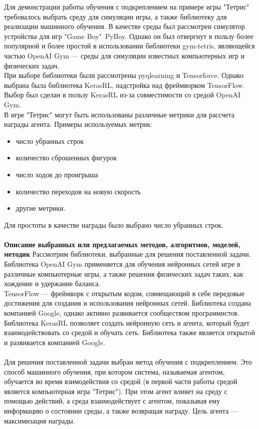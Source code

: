 \documentclass{article}
\begin{document}
Для демонстрации работы обучения с подкреплением на примере игры "Тетрис" требовалось выбрать среду для симуляции игры, а также библиотеку для реализации машинного обучения. 
В качестве среды был рассмотрен симулятор устройства для игр "Game Boy"\ PyBoy\cite{litlink11}. Однако он был отвергнут в пользу более популярной и более простой в использовании библиотеки gym-tetris\cite{litlink12}, являющейся частью OpenAI Gym\cite{litlink13} — среды для симуляции известных компьютерных игр и физических задач.\\
При выборе библиотеки были рассмотрены pyqlearning\cite{litlink14} и Tensorforce\cite{litlink15}. Однако выбрана была библиотека KerasRL\cite{litlink16}, надстройка над фреймворком TensorFlow\cite{litlink17}. Выбор был сделан в пользу KerasRL из-за совместимости со средой OpenAI Gym.\\
В игре "Тетрис" могут быть использованы различные метрики для рассчета награды агента. Примеры используемых метрик:
\begin{itemize}
\item число убранных строк
\item количество сброшенных фигурок
\item число ходов до проигрыша
\item количество переходов на новую скорость
\item другие метрики.
\end{itemize}
Для простоты в качестве награды было выбрано число убранных строк.\\~\\
\textbf{Описание выбранных или предлагаемых методов, алгоритмов, моделей, методик}
Рассмотрим библиотеки, выбранные для решения поставленной задачи. Библиотека OpenAI Gym применяется для обучения нейронных сетей игре в различные компьютерные игры, а также решения физических задач таких, как хождение и удержание баланса. \\
TensorFlow — фреймворк с открытым кодом, совмещающий в себе передовые достижения для создания и использования нейронных сетей. Библиотека создана компанией Google, однако активно развивается сообществом программистов\cite{litlink18}.\\
Библиотека KerasRL позволяет создать нейронную сеть и агента, который будет взаимодействовать со средой и обучать сеть. Библиотека также является открытой и развивается компанией Google.\\~\\
Для решения поставленной задачи выбран метод обучения с подкреплением. Это способ машинного обучения, при котором система, называемая агентом, обучается во время взимодействия со средой (в первой части работы средой является компьютерная игра "Тетрис"). При этом агент влияет на среду с помощью действий, а среда взаимодействует с агентом, показывая ему информацию о состоянии среды, а также возвращая награду. Цель агента — максимизация награды.\\
\end{document}
